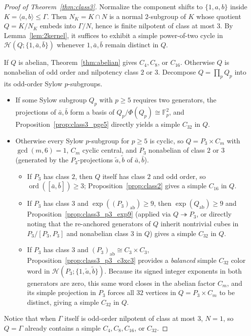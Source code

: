 \documentclass[11pt]{amsart}
\theoremstyle{definition}
\theoremstyle{remark}
\newcommand{\F}{\mathbb{F}}
\newcommand{\Haar}{\mathcal{H}}
\newcommand{\ord}{\operatorname{ord}}
\begin{document}
\begin{proof}[Proof of Theorem~\ref{thm:class3}]
Normalize the component shifts to $\{1, a, b\}$ inside $K = \langle a, b \rangle \le \Gamma$. Then $N_K = K \cap N$ is a normal $2$-subgroup of $K$ whose quotient $Q = K/N_K$ embeds into $\Gamma/N$, hence is finite nilpotent of class at most $3$. By Lemma~\ref{lem:2kernel}, it suffices to exhibit a simple power-of-two cycle in $\Haar(Q; \{1, \bar{a}, \bar{b}\})$ whenever $1, \bar{a}, \bar{b}$ remain distinct in $Q$.

If $Q$ is abelian, Theorem~\ref{thm:abelian} gives $C_4, C_8$, or $C_{16}$. Otherwise $Q$ is nonabelian of odd order and nilpotency class $2$ or $3$. Decompose $Q = \prod_p Q_p$ into its odd-order Sylow $p$-subgroups.
\begin{itemize}
\item If some Sylow subgroup $Q_p$ with $p \ge 5$ requires two generators, the projections of $\bar{a}, \bar{b}$ form a basis of $Q_p/\Phi(Q_p) \cong \F_p^2$, and Proposition~\ref{prop:class3_pge5} directly yields a simple $C_{32}$ in $Q$.
\item Otherwise every Sylow $p$-subgroup for $p \ge 5$ is cyclic, so $Q = P_3 \times C_m$ with $\gcd(m,6) = 1$, $C_m$ cyclic central, and $P_3$ nonabelian of class $2$ or $3$ (generated by the $P_3$-projections $\tilde{a}, \tilde{b}$ of $\bar{a}, \bar{b}$).
\begin{itemize}
\item If $P_3$ has class $2$, then $Q$ itself has class $2$ and odd order, so $\ord([\bar{a}, \bar{b}]) \ge 3$; Proposition~\ref{prop:class2} gives a simple $C_{16}$ in $Q$.
\item If $P_3$ has class $3$ and $\exp((P_3)_{\mathrm{ab}}) \ge 9$, then $\exp(Q_{\mathrm{ab}}) \ge 9$ and Proposition~\ref{prop:class3_p3_exp9} (applied via $Q \twoheadrightarrow P_3$, or directly noting that the re-anchored generators of $Q$ inherit nontrivial cubes in $P_3/[P_3,P_3]$ and nonabelian class $3$ in $Q$) gives a simple $C_{32}$ in $Q$.
\item If $P_3$ has class $3$ and $(P_3)_{\mathrm{ab}} \cong C_3 \times C_3$, Proposition~\ref{prop:class3_p3_c3xc3} provides a \emph{balanced} simple $C_{32}$ color word in $\Haar(P_3; \{1, \tilde{a}, \tilde{b}\})$. Because its signed integer exponents in both generators are zero, this same word closes in the abelian factor $C_m$, and its simple projection in $P_3$ forces all $32$ vertices in $Q = P_3 \times C_m$ to be distinct, giving a simple $C_{32}$ in $Q$.
\end{itemize}
\end{itemize}
Notice that when $\Gamma$ itself is odd-order nilpotent of class at most $3$, $N=1$, so $Q=\Gamma$ already contains a simple $C_4, C_8, C_{16}$, or $C_{32}$.
\end{proof}
\end{document}
